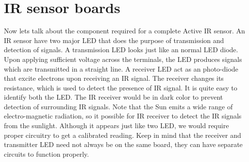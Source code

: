 \section{IR sensor boards}
Now lets talk about the component required for a complete Active IR sensor. An IR sensor have two major LED that does the purpose of transmission and detection of signals. A transmission LED looks just like an normal LED diode. Upon applying sufficient voltage across the terminals, the LED produces signals which are transmitted in a straight line. A receiver LED act as an photo-diode that excite electrons upon receiving an IR signal. The receiver changes its resistance, which is used to detect the presence of IR signal. It is quite easy to identify both the LED. The IR receiver would be in dark color to prevent detection of surrounding IR signals. Note that the Sun emits a wide range of electro-magnetic radiation, so it possible for IR receiver to detect the IR signals from the sunlight. Although it appears just like two LED, we would require proper circuitry to get a calibrated reading. Keep in mind that the receiver and transmitter LED need not always be on the same board, they can have separate circuits to function properly.\\

